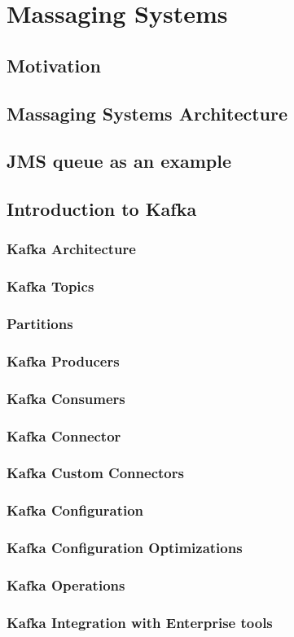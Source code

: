\section{Massaging Systems}
\subsection{Motivation}
\subsection{Massaging Systems Architecture}
\subsection{JMS queue as an example}
\subsection{Introduction to Kafka}
\subsubsection{Kafka Architecture}
\subsubsection{Kafka Topics}
\subsubsection{Partitions}
\subsubsection{Kafka Producers}
\subsubsection{Kafka Consumers}
\subsubsection{Kafka Connector}
\subsubsection{Kafka Custom Connectors}
\subsubsection{Kafka Configuration}
\subsubsection{Kafka Configuration Optimizations}
\subsubsection{Kafka Operations}
\subsubsection{Kafka Integration with Enterprise tools}